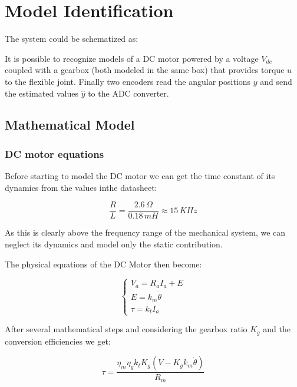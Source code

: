 \chapter{Model Identification}
\label{cha:model_identification}

    The system could be schematized as:


    It is possible to recognize models of a DC motor powered by a voltage $V_{dc}$ coupled with a gearbox (both modeled in the same box) that provides torque $u$ to the flexible joint. Finally two encoders read the angular positions $y$ and send the estimated values $\hat{y}$ to the ADC converter.

    \section{Mathematical Model}

        \subsection{DC motor equations}

            Before starting to model the DC motor we can get the time constant of its dynamics from the values inthe datasheet:

            \[
                \frac{R}{L} = \frac{2.6 \, \Omega}{0.18 \, mH} \approx  15 \, KHz
            \]
                
            As this is clearly above the frequency range of the mechanical system, we can neglect its dynamics and model only the static contribution.
            
            The physical equations of the DC Motor then become:
            
            \begin{equation*}
                \begin{cases}
                    V_a = R_a I_a + E \\
                    E = k_m \dot\theta \\
                    \tau = k_t I_a
                \end{cases}
            \end{equation*}

            After several mathematical steps and considering the gearbox ratio $K_g$ and the conversion efficiencies we get:

            \[
                \tau = \frac{\eta_m\eta_g k_t K_g(V - K_g k_m\dot\theta)}{R_m} 
            \]
            
